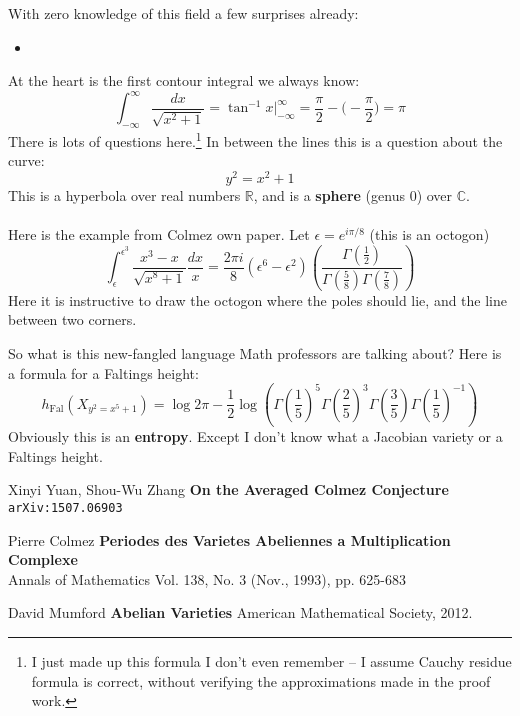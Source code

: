 \documentclass[12pt]{article}
\begin{document}
\newpage

\noindent With zero knowledge of this field a few surprises already:
\begin{itemize}
	\item 
\end{itemize}
At the heart is the first contour integral we always know:
$$  \int_{-\infty}^\infty \frac{dx}{\sqrt{x^2 + 1}} = \tan^{-1} x \bigg|^\infty_{-\infty} = \frac{\pi}{2} - \bigg(-\frac{\pi}{2} \bigg) = \pi $$
There is lots of questions here.\footnote{ I just made up this formula I don't even remember -- I assume Cauchy residue formula is correct, without verifying the approximations made in the proof work.}  In between the lines this is a question about the curve:
$$ y^2 = x^2 + 1 $$
This is a hyperbola over real numbers $\mathbb{R}$, and is a \textbf{sphere} (genus 0) over $\mathbb{C}$. \\ \\ 
Here is the example from Colmez own paper.  Let $\epsilon = e^{i\pi/8}$ (this is an {\color{green!80!white}octogon})
$$ \int_\epsilon^{\epsilon^3} \frac{x^3 - x}{\sqrt{x^8 + 1}} \frac{dx}{x} = \frac{2\pi i}{8} (\epsilon^6 - \epsilon^2) \left( \frac{\Gamma(\frac{1}{2})}{
\Gamma(\frac{5}{8})\Gamma(\frac{7}{8})} \right)$$
Here it is instructive to draw the octogon where the poles should lie, and the line between two corners. 
\newpage

\noindent So what is this new-fangled language Math professors are talking about?  Here is a formula for a Faltings height:
$$ h_\text{Fal}( X_{y^2 = x^5 + 1})
= \log 2\pi - \frac{1}{2} \log \left(
\Gamma(\frac{1}{5})^5
\Gamma(\frac{2}{5})^3
\Gamma(\frac{3}{5})
\Gamma(\frac{1}{5})^{-1} \right) $$
Obviously this is an \textbf{entropy}.  Except I don't know what a Jacobian variety or a Faltings height.

\newpage
{}\selectfont \fontsize{12}{10}\selectfont


\begin{thebibliography}{}

\item Xinyi Yuan, Shou-Wu Zhang \textbf{On the Averaged Colmez Conjecture} \texttt{arXiv:1507.06903}

\item Pierre Colmez \textbf{Periodes des Varietes Abeliennes a Multiplication Complexe} \\ Annals of Mathematics Vol. 138, No. 3 (Nov., 1993), pp. 625-683

\item David Mumford \textbf{Abelian Varieties} American Mathematical Society, 2012.

\item 

\end{thebibliography}
\end{document}

